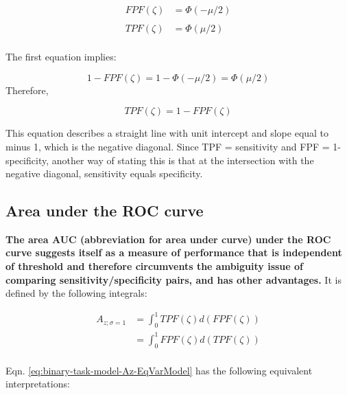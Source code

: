 \documentclass[
]{book}
\begin{document}
\begin{equation} 
\begin{aligned} 
FPF\left ( \zeta \right ) &=\Phi\left ( -\mu/2 \right )\\
\\
TPF\left ( \zeta \right ) &=\Phi\left (\mu/2 \right )\\ 
\end{aligned} 
\label{eq:binary-task-model-NegDiagIntersection}
\end{equation}

The first equation implies:

\[1-FPF\left ( \zeta \right ) =1-\Phi\left ( -\mu/2 \right )= \Phi\left ( \mu/2 \right )\]
Therefore,

\begin{equation} 
TPF\left ( \zeta \right ) = 1-FPF\left ( \zeta \right )
\label{eq:binary-task-model-NegDiagIntersection2}
\end{equation}

This equation describes a straight line with unit intercept and slope equal to minus 1, which is the negative diagonal. Since TPF = sensitivity and FPF = 1- specificity, another way of stating this is that at the intersection with the negative diagonal, sensitivity equals specificity.

\hypertarget{binary-task-model-auc-roc-important}{%
\subsection{Area under the ROC curve}\label{binary-task-model-auc-roc-important}}

\textbf{The area AUC (abbreviation for area under curve) under the ROC curve suggests itself as a measure of performance that is independent of threshold and therefore circumvents the ambiguity issue of comparing sensitivity/specificity pairs, and has other advantages.} It is defined by the following integrals:

\begin{equation} 
\begin{aligned}
A_{z;\sigma = 1} &= \int_{0}^{1}TPF(\zeta)d(FPF(\zeta))\\
&=\int_{0}^{1}FPF(\zeta)d(TPF(\zeta))\\
\end{aligned}
\label{eq:binary-task-model-Az-EqVarModel}
\end{equation}

Eqn. \eqref{eq:binary-task-model-Az-EqVarModel} has the following equivalent interpretations:
\end{document}
